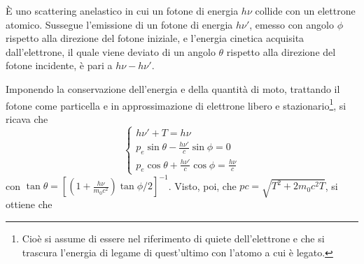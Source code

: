 \documentclass[11pt, a4paper]{scrartcl}
\theoremstyle{style}
\theoremstyle{style1}
\numberwithin{equation}{subsection}
\begin{document}
\`E uno scattering anelastico in cui un fotone di energia $h\nu $ collide con un elettrone atomico.
Sussegue l'emissione di un fotone di energia $h\nu '$, emesso con angolo $\phi $ rispetto alla direzione del fotone iniziale, e l'energia cinetica acquisita dall'elettrone, il quale viene deviato di un angolo $\theta $ rispetto alla direzione del fotone incidente, \`e pari a $h\nu - h\nu '$.
\begin{center}
\end{center}
Imponendo la conservazione dell'energia e della quantit\`a di moto, trattando il fotone come particella e in approssimazione di elettrone libero e stazionario\footnote{Cio\`e si assume di essere nel riferimento di quiete dell'elettrone e che si trascura l'energia di legame di quest'ultimo con l'atomo a cui \`e legato.}, si ricava che
\[
\begin{cases}
	h\nu  ' + T = h\nu \\
	\displaystyle p_e \sin \theta  - \frac{h\nu '}{c} \sin\phi  = 0 \\
	\displaystyle p_e \cos \theta  + \frac{h\nu '}{c} \cos \phi  = \frac{h\nu }{c}
\end{cases}
\] 
con $\tan\theta = \left[ \left(1 + \frac{h\nu }{m_0c^2}\right) \tan\phi  / 2 \right] ^{-1}$.
Visto, poi, che $pc = \sqrt{T^2 + 2 m_0 c^2 T} $, si ottiene che 
\end{document}
